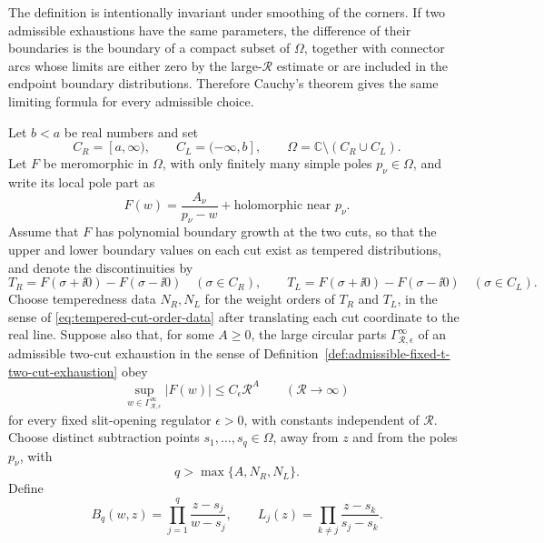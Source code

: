 \begin{definition}
The definition is intentionally invariant under smoothing of the corners.
If two admissible exhaustions have the same parameters, the difference of
their boundaries is the boundary of a compact subset of \(\Omega\), together
with connector arcs whose limits are either zero by the large-\(\mathcal R\)
estimate or are included in the endpoint boundary distributions.  Therefore
Cauchy's theorem gives the same limiting formula for every admissible
choice.
\end{definition}

\begin{theorem}
\label{thm:fixed-t-finite-subtraction-cauchy}
Let \(b<a\) be real numbers and set
\[
  C_R=[a,\infty),\qquad C_L=(-\infty,b],\qquad
  \Omega=\mathbb C\setminus(C_R\cup C_L).
\]
Let \(F\) be meromorphic in \(\Omega\), with only finitely many simple poles
\(p_\nu\in\Omega\), and write its local pole part as
\begin{equation}
  F(w)=\frac{A_\nu}{p_\nu-w}+\text{holomorphic near }p_\nu .
  \label{eq:fixed-t-cauchy-pole-convention}
\end{equation}
Assume that \(F\) has polynomial boundary growth at the two cuts, so that the
upper and lower boundary values on each cut exist as tempered distributions,
and denote the discontinuities by
\[
  T_R=F(\sigma+\ii0)-F(\sigma-\ii0)\quad(\sigma\in C_R),
  \qquad
  T_L=F(\sigma+\ii0)-F(\sigma-\ii0)\quad(\sigma\in C_L).
\]
Choose temperedness data \(N_R,N_L\) for the weight orders of \(T_R\) and
\(T_L\), in the sense of
\eqref{eq:tempered-cut-order-data} after translating each cut coordinate to
the real line.  Suppose also that, for some \(A\ge0\), the large circular
parts \(\Gamma^\infty_{\mathcal R,\epsilon}\) of an admissible two-cut
exhaustion in the sense of
Definition~\ref{def:admissible-fixed-t-two-cut-exhaustion} obey
\begin{equation}
  \sup_{w\in\Gamma^\infty_{\mathcal R,\epsilon}}
  |F(w)|\le C_\epsilon \mathcal R^A
  \qquad(\mathcal R\to\infty)
  \label{eq:fixed-t-large-circle-polynomial-bound}
\end{equation}
for every fixed slit-opening regulator \(\epsilon>0\), with constants
independent of \(\mathcal R\).
Choose distinct subtraction points
\(s_1,\ldots,s_q\in\Omega\), away from \(z\) and from the poles \(p_\nu\),
with
\[
  q>\max\{A,N_R,N_L\}.
\]
Define
\begin{equation}
  B_q(w,z)=\prod_{j=1}^q\frac{z-s_j}{w-s_j},
  \qquad
  L_j(z)=\prod_{k\ne j}\frac{z-s_k}{s_j-s_k}.

\end{equation}
\end{theorem}
